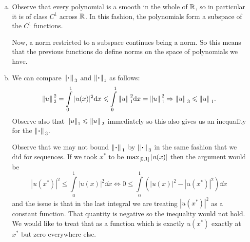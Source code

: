 \documentclass[12pt]{memoir}
\begin{document}
\begin{ptcbr}
\begin{enumerate}[(a)]
    \item Observe that every polynomial is a smooth in the whole of $\mathbb{R}$, so in particular it is of class $C^1$ across $\mathbb{R}$. In this fashion, the polynomials form a subspace of the $C^1$ functions.\par 
    Now, a norm restricted to a subspace continues being a norm. So this means that the previous functions do define norms on the space of polynomials we have.
    \item We can compare $\norm*{\.}_3$ and $\norm{\.}_1$ as follows:
    $$\norm*{u}_3^2=\int\limits_0^1|u(x)|^2\dd x\leqslant\int\limits_0^1\norm*{u}_1^2\dd x=\norm*{u}_1^2\Rightarrow\norm*{u}_3\leqslant \norm*{u}_1.$$
    Observe also that $\norm{u}_1\leqslant\norm*{u}_2$ immediately so this also gives us an inequality for the $\norm*{\.}_3$.\par 
    Observe that we may not bound $\norm*{\.}_1$ by $\norm*{\.}_3$ in the same fashion that we did for sequences. If we took $x^\ast$ to be $\max_{\left\lbrack0,1\right\rbrack}|u(x)|$ then the argument would be 
    $$|u(x^\ast)|^2\leq\int\limits_0^1|u(x)|^2\dd x\iff 0\leq\int\limits_0^1(|u(x)|^2-|u(x^\ast)|^2)\dd x$$
    and the issue is that in the last integral we are treating $|u(x^\ast)|^2$ as a constant function. That quantity is negative so the inequality would not hold. We would like to treat that as a function which is exactly $u(x^\ast)$ exactly at $x^\ast$ but zero everywhere else. 
\end{enumerate}
\end{ptcbr}
\end{document}
